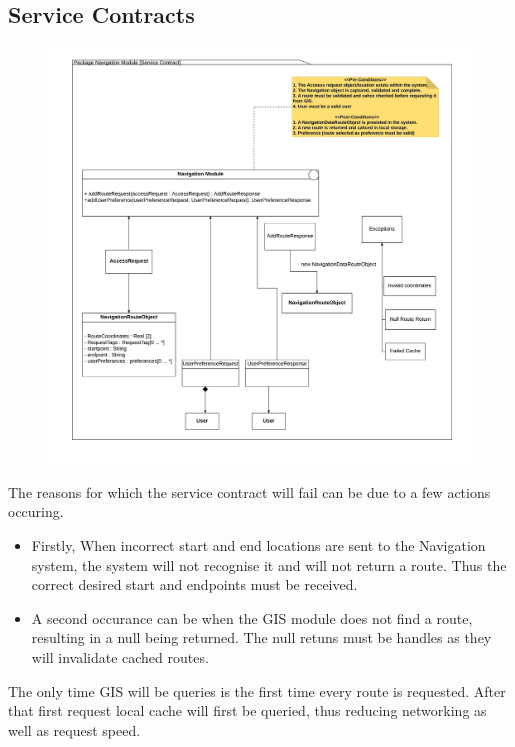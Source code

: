 \documentclass[12pt]{article}
\begin{document}
\subsection{Service Contracts}
\begin{figure}[!htb]
\centering
\includegraphics[scale=0.4]{diagrams/Service_Contract.jpeg}
\end{figure}
The reasons for which the service contract will fail can be due to a few actions occuring. 
\begin{itemize}

\item Firstly, When incorrect start and end locations are sent to the Navigation system, the system will not recognise it and will not return a route. Thus the correct desired start and endpoints must be received.


\item  A second occurance can be when the GIS module does not find a route, resulting in a null being returned. The null retuns must be handles as they will invalidate cached routes.
\end{itemize}

The only time GIS will be queries is the first time every route is requested. After that first request local cache will first be queried, thus reducing networking as well as request speed.
\end{document}
